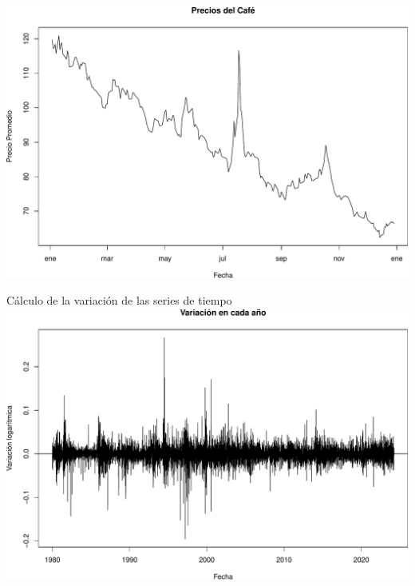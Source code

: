 \documentclass[
  10pt,
  ignorenonframetext,
  aspectratio=1612]{beamer}
\newenvironment{Shaded}{\begin{snugshade}}{\end{snugshade}}
\newcommand{\AttributeTok}[1]{\textcolor[rgb]{0.13,0.29,0.53}{#1}}
\newcommand{\FunctionTok}[1]{\textcolor[rgb]{0.13,0.29,0.53}{\textbf{#1}}}
\newcommand{\NormalTok}[1]{#1}
\newcommand{\SpecialCharTok}[1]{\textcolor[rgb]{0.81,0.36,0.00}{\textbf{#1}}}
\newcommand{\StringTok}[1]{\textcolor[rgb]{0.31,0.60,0.02}{#1}}
\begin{document}
\begin{frame}[fragile]{}
\label{section}
\begin{Shaded}
\end{Shaded}

\includegraphics{Informe_files/figure-beamer/unnamed-chunk-7-1.pdf}
\end{frame}

\begin{frame}{Cálculo de la variación de las series de tiempo}
\label{cuxe1lculo-de-la-variaciuxf3n-de-las-series-de-tiempo}
\includegraphics{Informe_files/figure-beamer/unnamed-chunk-8-1.pdf}
\end{frame}
\end{document}
